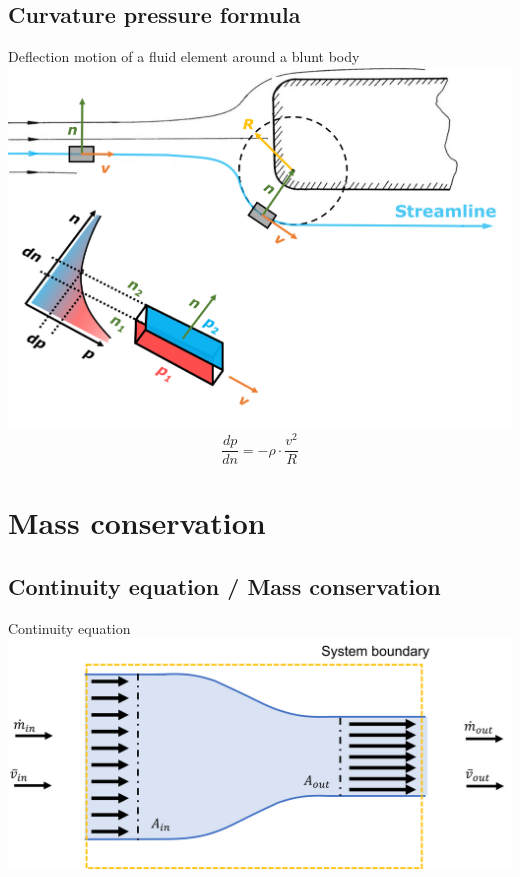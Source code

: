 \documentclass{article}
\begin{document}
\begin{multicols}{2}
\subsection{Curvature pressure formula}
\begin{examplebox}{Deflection motion of a fluid element around a blunt body}
    \includegraphics[width=\textwidth]{media/pressure_curvatur.png}
    \vspace*{-0.6cm}
    \begin{equation}
        \dfrac{dp}{dn} = -\rho\cdot\dfrac{v^2}{R}
    \end{equation}
\end{examplebox}

\vfill
\phantom{}
\columnbreak

\section{Mass conservation}
\subsection{Continuity equation / Mass conservation}
\begin{theorybox}{Continuity equation}
    \includegraphics[width=\textwidth]{media/ContinuityBild1.png}

\end{theorybox}
\end{multicols}
\end{document}
